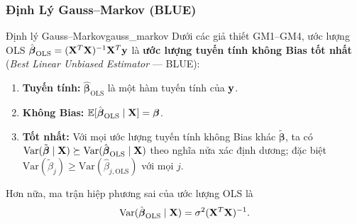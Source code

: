 \subsubsection{Định Lý Gauss--Markov (BLUE)}


\begin{mythm}{Định lý Gauss--Markov}{gauss_markov}
Dưới các giả thiết GM1--GM4, ước lượng OLS
$\hat{\boldsymbol{\beta}}_{\mathrm{OLS}} = (\mathbf{X}^T\mathbf{X})^{-1}\mathbf{X}^T\mathbf{y}$
là \textbf{ước lượng tuyến tính không Bias tốt nhất} (\textit{Best Linear Unbiased
Estimator} --- BLUE):
\begin{enumerate}[label=(\roman*), noitemsep]
    \item \textbf{Tuyến tính:} $\hat{\boldsymbol{\beta}}_{\mathrm{OLS}}$ là một hàm
          tuyến tính của $\mathbf{y}$.
    \item \textbf{Không Bias:} $\mathbb{E}[\hat{\boldsymbol{\beta}}_{\mathrm{OLS}}\mid\mathbf{X}]
          = \boldsymbol{\beta}$.
    \item \textbf{Tốt nhất:} Với mọi ước lượng tuyến tính không Bias khác
          $\tilde{\boldsymbol{\beta}}$, ta có
          $\mathrm{Var}(\tilde{\boldsymbol{\beta}}\mid\mathbf{X})
          \succeq \mathrm{Var}(\hat{\boldsymbol{\beta}}_{\mathrm{OLS}}\mid\mathbf{X})$
          theo nghĩa nửa xác định dương; đặc biệt
          $\mathrm{Var}(\tilde{\beta}_j) \geq \mathrm{Var}(\hat{\beta}_{j,\mathrm{OLS}})$
          với mọi $j$.
\end{enumerate}
Hơn nữa, ma trận hiệp phương sai của ước lượng OLS là
\begin{equation}
    \mathrm{Var}(\hat{\boldsymbol{\beta}}_{\mathrm{OLS}}\mid\mathbf{X})
    = \sigma^2(\mathbf{X}^T\mathbf{X})^{-1}.
    \label{eq:ols_cov}
\end{equation}
\end{mythm}


